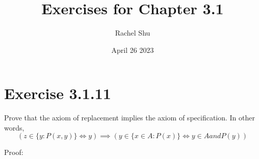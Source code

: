 \documentclass{article}
\title{Exercises for Chapter 3.1}
\author{Rachel Shu}
\date{April 26 2023}
\begin{document}
\maketitle

\section{Exercise 3.1.11}

Prove that the axiom of replacement implies the axiom of specification. In other words,
\begin{equation}
    (
        z \in \{  y:P(x,y) \} 
        \iff
        y 
    )
    \implies
    (
        y \in \{ x \in A : P(x) \}
        \iff
        y \in A and P(y)
    )  
\end{equation}

Proof: 
\end{document}
